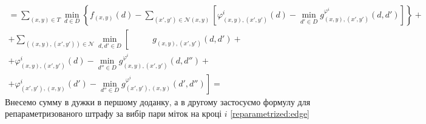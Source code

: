 \begin{equation*}
\begin{gathered}
    = \sum \limits_{\left(x, y \right) \in T}
        \min \limits_{d \in D} \left\{
            f_{ \left(x, y \right)} \left(d \right) -
            \sum \limits_{\left(x', y' \right) \in \mathcal{N} \left(x, y \right)}
            \left[
                \varphi_{ \left(x, y \right), \left(x', y' \right)}^i
                    \left(d \right) -
                \min \limits_{d' \in D}
                    g_{\left(x, y \right), \left(x', y' \right)}^{\varphi^i}
                        \left( d, d' \right)
            \right]
        \right\} + \\
    + \sum \limits_{\left(\left(x, y \right), \left(x', y' \right) \right) \in \mathcal{N}}
        \min \limits_{d, d' \in D} \left[ \phantom{\min \limits_{d'' \in D}}
            g_{\left(x, y \right), \left(x', y' \right)} \left(d, d' \right) + \right. \\
            + \varphi_{\left(x, y \right), \left(x', y' \right)}^i
                \left(d \right) -
            \min \limits_{d'' \in D}
                g_{\left(x, y \right), \left(x', y' \right)}^{\varphi^i}
                    \left(d, d'' \right) + \\
            \left. + \varphi_{\left(x', y' \right), \left(x, y \right)}^i
                \left(d' \right) -
            \min \limits_{d'' \in D}
                g_{\left(x', y' \right), \left(x, y \right)}^{\varphi^i}
                    \left(d', d'' \right)
        \right] =
\end{gathered}
\end{equation*}
Внесемо сумму в дужки в першому доданку,
а в другому застосуємо формулу для репараметризованого
штрафу за вибір пари міток на кроці $i$ \eqref{reparametrized:edge}
